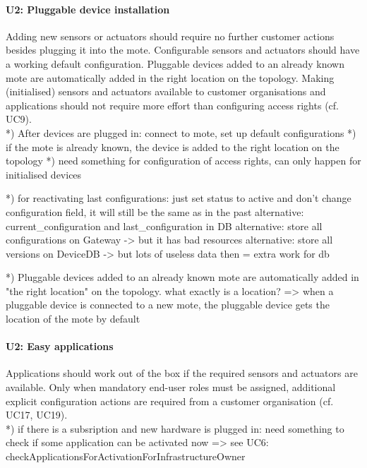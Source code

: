         \paragraph{U2: Pluggable device installation}
            Adding new sensors or actuators should require no further customer
            actions besides plugging it into the mote. Configurable sensors and
            actuators should have a working default configuration.
            Pluggable devices added to an already known mote are automatically
            added in the right location on the topology.
            Making (initialised) sensors and actuators available to customer
            organisations and applications should not require more effort than
            configuring access rights (cf. UC9). \\
            *) After devices are plugged in: connect to mote, set up default configurations
            *) if the mote is already known, the device is added to the right location on the topology
            *) need something for configuration of access rights, can only happen for initialised devices

            *) for reactivating last configurations: just set status to active and don't change configuration field, it will still be the same as in the past
                alternative: current\_configuration and last\_configuration in DB
                alternative: store all configurations on Gateway -> but it has bad resources
                alternative: store all versions on DeviceDB -> but lots of useless data then = extra work for db

            *) Pluggable devices added to an already known mote are automatically added in "the right location" on the topology.
                what exactly is a location?
                => when a pluggable device is connected to a new mote, the pluggable device gets the location of the mote by default

        \paragraph{U2: Easy applications}
            Applications should work out of the box if the required sensors and
            actuators are available. Only when mandatory end-user roles must be
            assigned, additional explicit configuration actions are required
            from a customer organisation (cf. UC17, UC19). \\
            *) if there is a subsription and new hardware is plugged in: need something to check
               if some application can be activated now => see UC6: checkApplicationsForActivationForInfrastructureOwner

